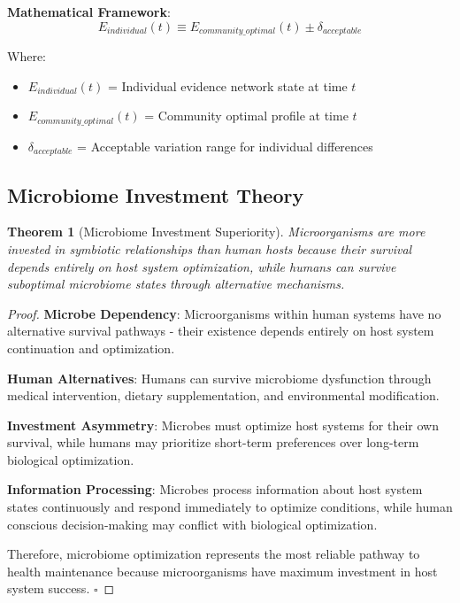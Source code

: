 \documentclass[12pt,a4paper]{article}
\newtheorem{theorem}{Theorem}[section]
\begin{document}
\textbf{Mathematical Framework}:
\begin{equation}
E_{individual}(t) \equiv E_{community\_optimal}(t) \pm \delta_{acceptable}
\end{equation}

Where:
\begin{itemize}
\item $E_{individual}(t)$ = Individual evidence network state at time $t$
\item $E_{community\_optimal}(t)$ = Community optimal profile at time $t$  
\item $\delta_{acceptable}$ = Acceptable variation range for individual differences
\end{itemize}

\subsection{Microbiome Investment Theory}

\begin{theorem}[Microbiome Investment Superiority]
Microorganisms are more invested in symbiotic relationships than human hosts because their survival depends entirely on host system optimization, while humans can survive suboptimal microbiome states through alternative mechanisms.
\end{theorem}

\begin{proof}
\textbf{Microbe Dependency}: Microorganisms within human systems have no alternative survival pathways - their existence depends entirely on host system continuation and optimization.

\textbf{Human Alternatives}: Humans can survive microbiome dysfunction through medical intervention, dietary supplementation, and environmental modification.

\textbf{Investment Asymmetry}: Microbes must optimize host systems for their own survival, while humans may prioritize short-term preferences over long-term biological optimization.

\textbf{Information Processing}: Microbes process information about host system states continuously and respond immediately to optimize conditions, while human conscious decision-making may conflict with biological optimization.

Therefore, microbiome optimization represents the most reliable pathway to health maintenance because microorganisms have maximum investment in host system success. $\square$
\end{proof}
\end{document}
